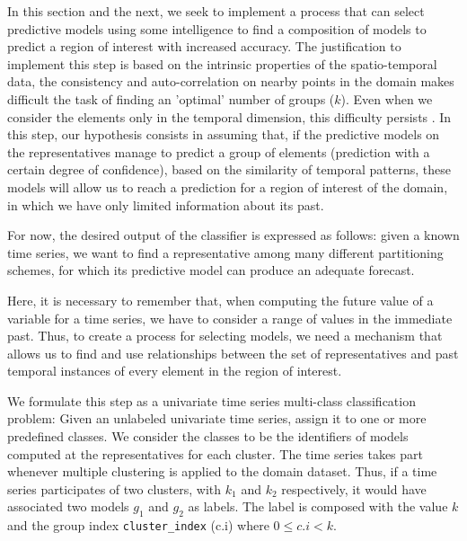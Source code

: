 In this section and the next, we seek to implement a process that can select predictive models using some intelligence to find a composition of models to predict a region of interest with increased accuracy. The justification to implement this step is based on the intrinsic properties of the spatio-temporal data, the consistency and auto-correlation on nearby points in the domain makes difficult the task of finding an 'optimal' number of groups ($k$). Even when we consider the elements only in the temporal dimension, this difficulty persists \cite{}. In this step, our hypothesis consists in assuming that, if the predictive models on the representatives manage to predict a group of elements (prediction with a certain degree of confidence), based on the similarity of temporal patterns, these models will allow us to reach a prediction for a region of interest of the domain, in which we have only limited information about its past. 

For now, the desired output of the classifier is expressed as follows: given a known time series, we want to find a representative among many different partitioning schemes, for which its predictive model can produce an adequate forecast.

Here, it is necessary to remember that, when computing the future value of a variable for a time series, we have to consider a range of values in the immediate past\cite{Chatfield2001}. Thus, to create a process for selecting models, we need a mechanism that allows us to find and use relationships between the set of representatives and past temporal instances of every element in the region of interest.

We formulate this step as a univariate time series multi-class classification problem: Given an unlabeled univariate time series, assign it to one or more predefined classes. We consider the classes to be the identifiers of models computed at the representatives for each cluster. The time series takes part whenever multiple clustering is applied to the domain dataset. Thus, if a time series participates of two clusters, with $k_1$ and $k_2$ respectively, it would have associated two models $g_1$ and $g_2$ as labels. The label is composed with the value $k$ and the group index \texttt{cluster\_index} (c.i) where $0 \leq c.i <k$.

